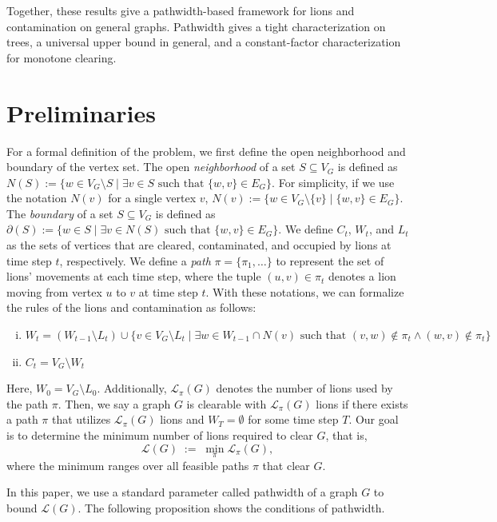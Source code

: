 \documentclass[a4paper,UKenglish,cleveref, autoref, thm-restate]{lipics-v2021}
\begin{document}
Together, these results give a pathwidth-based framework for lions and contamination on general graphs. Pathwidth gives a tight characterization on trees, a universal upper bound in general, and a constant-factor characterization for monotone clearing.

\section{Preliminaries}\label{sec:preliminaries}
For a formal definition of the problem, we first define the open neighborhood and boundary of the vertex set. The open \emph{neighborhood} of a set $S\subseteq V_G$ is defined as $N(S) := \{w \in V_G \setminus S \mid \exists v \in S \text{ such that } \{w, v\} \in E_G\}$. For simplicity, if we use the notation $N(v)$ for a single vertex $v$, $N(v) := \{w \in V_G \setminus \{v\} \mid \{w, v\} \in E_G\}$. The \emph{boundary} of a set $S\subseteq V_G$ is defined as $\partial(S) := \{w \in S \mid \exists v \in N(S) \text{ such that } \{w, v\} \in E_G\}$. We define $C_t$, $W_t$, and $L_t$ as the sets of vertices that are cleared, contaminated, and occupied by lions at time step $t$, respectively. We define a \emph{path} $\pi=\{\pi_1, \dots\}$ to represent the set of lions' movements at each time step, where the tuple $(u, v)\in \pi_t$ denotes a lion moving from vertex $u$ to $v$ at time step $t$. With these notations, we can formalize the rules of the lions and contamination as follows:
\begin{enumerate}[(i)]
    \item \(W_t = (W_{t-1} \setminus L_t) \cup \{v \in V_G \setminus L_t \mid \exists w \in W_{t-1} \cap N(v) \text{ such that } (v, w) \notin \pi_t \land (w, v) \notin \pi_t \}\)
    \item \(C_t = V_G \setminus W_t\)
\end{enumerate}
Here, $W_0=V_G\setminus L_0$. Additionally, \(\mathcal{L}_\pi(G)\) denotes the number of lions used by the path \(\pi\). Then, we say a graph $G$ is clearable with $\mathcal{L}_\pi(G)$ lions if there exists a path $\pi$ that utilizes $\mathcal{L}_\pi(G)$ lions and $W_T=\emptyset$ for some time step $T$.
Our goal is to determine the minimum number of lions required to clear \(G\), that is,
\[
\mathcal{L}(G) \;:=\; \min_{\pi} \mathcal{L}_{\pi}(G),
\]
where the minimum ranges over all feasible paths \(\pi\) that clear \(G\).

In this paper, we use a standard parameter called pathwidth \cite{dereniowski2012pathwidth,RobertsonI} of a graph $G$ to bound $\mathcal{L}(G)$. The following proposition shows the conditions of pathwidth.
\end{document}
